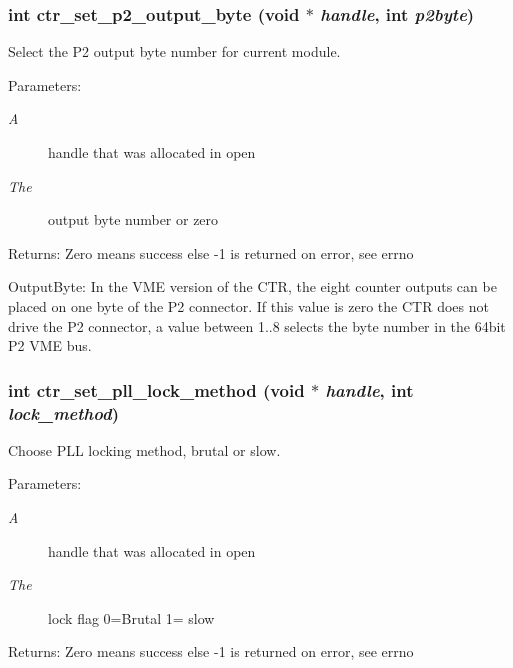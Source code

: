 \subsubsection{\setlength{\rightskip}{0pt plus 5cm}int ctr\_\-set\_\-p2\_\-output\_\-byte (void $\ast$ {\em handle}, int {\em p2byte})}\label{libctr_8doxygen_14f8812fa84c11b88e2921607f624295}


Select the P2 output byte number for current module. 

\begin{Desc}
\item[Parameters:]
\begin{description}
\item[{\em A}]handle that was allocated in open \item[{\em The}]output byte number or zero \end{description}
\end{Desc}
\begin{Desc}
\item[Returns:]Zero means success else -1 is returned on error, see errno\end{Desc}
Output\-Byte: In the VME version of the CTR, the eight counter outputs can be placed on one byte of the P2 connector. If this value is zero the CTR does not drive the P2 connector, a value between 1..8 selects the byte number in the 64bit P2 VME bus. 
\subsubsection{\setlength{\rightskip}{0pt plus 5cm}int ctr\_\-set\_\-pll\_\-lock\_\-method (void $\ast$ {\em handle}, int {\em lock\_\-method})}\label{libctr_8doxygen_5860a1bdeaa79388579c620107d0340f}


Choose PLL locking method, brutal or slow. 

\begin{Desc}
\item[Parameters:]
\begin{description}
\item[{\em A}]handle that was allocated in open \item[{\em The}]lock flag 0=Brutal 1= slow \end{description}
\end{Desc}
\begin{Desc}
\item[Returns:]Zero means success else -1 is returned on error, see errno \end{Desc}
